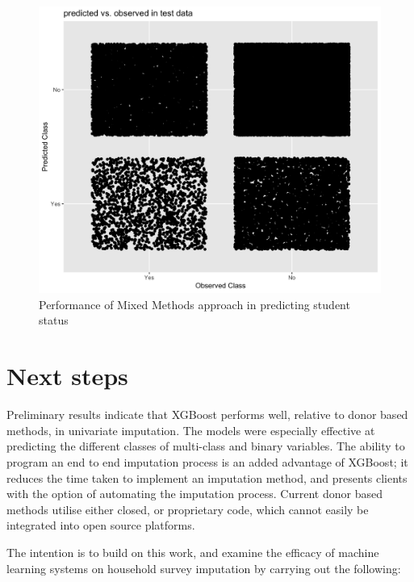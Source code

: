 \documentclass[]{book}
\begin{document}
\begin{figure}
\centering
\includegraphics{images/STCANCEISXGqplot.png}
\caption{Performance of Mixed Methods approach in predicting student
status}
\end{figure}

\chapter{Next steps}\label{next-steps}

Preliminary results indicate that XGBoost performs well, relative to
donor based methods, in univariate imputation. The models were
especially effective at predicting the different classes of multi-class
and binary variables. The ability to program an end to end imputation
process is an added advantage of XGBoost; it reduces the time taken to
implement an imputation method, and presents clients with the option of
automating the imputation process. Current donor based methods utilise
either closed, or proprietary code, which cannot easily be integrated
into open source platforms.

The intention is to build on this work, and examine the efficacy of
machine learning systems on household survey imputation by carrying out
the following:
\end{document}

